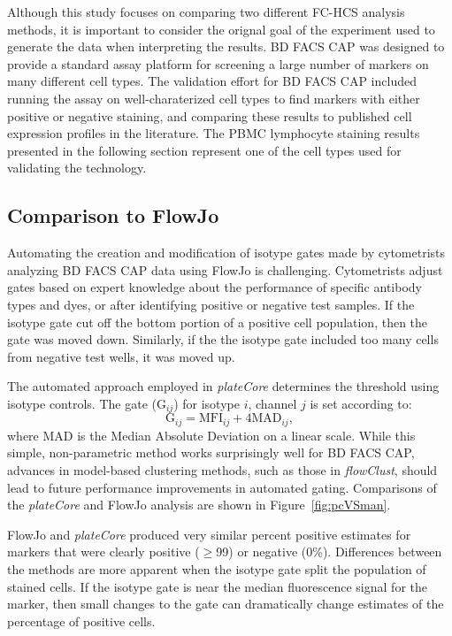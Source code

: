 \documentclass[12pt]{article}
\newcommand{\Rpackage}[1]{{\textit{#1}}}
\begin{document}
Although this study focuses on comparing two different FC-HCS analysis methods,
it is important to consider the orignal goal of the experiment used to generate
the data when interpreting the results. BD FACS CAP was designed to provide a
standard assay platform for screening a large number of markers on many
different cell types. The validation effort for BD FACS CAP included running
the assay on well-charaterized cell types to find markers with either positive
or negative staining, and comparing these results to published cell expression
profiles in the literature. The PBMC lymphocyte staining results presented in
the following section represent one of the cell types used for validating the
technology.


\subsection*{Comparison to FlowJo}

Automating the creation and modification of isotype gates made by cytometrists
analyzing BD FACS CAP data using FlowJo is challenging. Cytometrists adjust
gates based on expert knowledge about the performance of specific antibody
types and dyes, or after identifying positive or negative test samples. If the
isotype gate cut off the bottom portion of a positive cell population, then
the gate was moved down.  Similarly, if the the isotype gate included too many
cells from negative test wells, it was moved up.

The automated approach employed in \Rpackage{plateCore} determines the
threshold using isotype controls. The gate (G$_{ij}$) for isotype $i$, channel
$j$ is set according to:
\begin{equation}
\text{G}_{ij} = \text{MFI}_{ij} + 4 \text{MAD}_{ij},
\label{isoGate}
\end{equation}
where MAD is the Median Absolute Deviation on a linear scale. While this simple,
non-parametric method works surprisingly well for BD FACS CAP, advances in model-based
clustering methods, such as those in \Rpackage{flowClust}, should lead to
future performance improvements in automated gating. Comparisons of the
\Rpackage{plateCore} and FlowJo analysis are shown in Figure~\ref{fig:pcVSman}.

FlowJo and \Rpackage{plateCore} produced very similar percent positive
estimates for markers that were clearly positive ($\ge$99) or negative (0\%).
Differences between the methods are more apparent when the isotype gate split
the population of stained cells. If the isotype gate is near the median
fluorescence signal for the marker, then small changes to the gate can
dramatically change estimates of the percentage of positive cells. 
\end{document}
